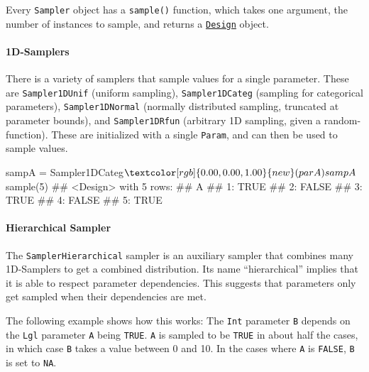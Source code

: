 \documentclass[
  11pt,
  parskip=half,
  DIV=calc,
  BCOR=10mm,
  x11names]{scrbook}
\newenvironment{Shaded}{}{}
\newcommand{\DecValTok}[1]{#1}
\newcommand{\KeywordTok}[1]{\textcolor[rgb]{0.00,0.00,1.00}{#1}}
\newcommand{\NormalTok}[1]{#1}
\newcommand{\OperatorTok}[1]{#1}
\newcommand{\StringTok}[1]{\textcolor[rgb]{0.00,0.50,0.50}{#1}}
\begin{document}
Every \texttt{Sampler} object has a \texttt{sample()} function, which takes one argument, the number of instances to sample, and returns a \protect\hyperlink{parameter-designs}{\texttt{Design}} object.

\hypertarget{d-samplers}{%
\paragraph{1D-Samplers}\label{d-samplers}}

There is a variety of samplers that sample values for a single parameter.
These are \texttt{Sampler1DUnif} (uniform sampling), \texttt{Sampler1DCateg} (sampling for categorical parameters), \texttt{Sampler1DNormal} (normally distributed sampling, truncated at parameter bounds), and \texttt{Sampler1DRfun} (arbitrary 1D sampling, given a random-function).
These are initialized with a single \texttt{Param}, and can then be used to sample values.

\begin{Shaded}
\begin{Highlighting}[]
\NormalTok{sampA =}\StringTok{ }\NormalTok{Sampler1DCateg}\OperatorTok{$}\KeywordTok{new}\NormalTok{(parA)}
\NormalTok{sampA}\OperatorTok{$}\KeywordTok{sample}\NormalTok{(}\DecValTok{5}\NormalTok{)}
\NormalTok{## <Design> with 5 rows:}
\NormalTok{##        A}
\NormalTok{## 1:  TRUE}
\NormalTok{## 2: FALSE}
\NormalTok{## 3:  TRUE}
\NormalTok{## 4: FALSE}
\NormalTok{## 5:  TRUE}
\end{Highlighting}
\end{Shaded}

\hypertarget{hierarchical-sampler}{%
\paragraph{Hierarchical Sampler}\label{hierarchical-sampler}}

The \texttt{SamplerHierarchical} sampler is an auxiliary sampler that combines many 1D-Samplers to get a combined distribution.
Its name ``hierarchical'' implies that it is able to respect parameter dependencies.
This suggests that parameters only get sampled when their dependencies are met.

The following example shows how this works: The \texttt{Int} parameter \texttt{B} depends on the \texttt{Lgl} parameter \texttt{A} being \texttt{TRUE}.
\texttt{A} is sampled to be \texttt{TRUE} in about half the cases, in which case \texttt{B} takes a value between 0 and 10.
In the cases where \texttt{A} is \texttt{FALSE}, \texttt{B} is set to \texttt{NA}.
\end{document}
